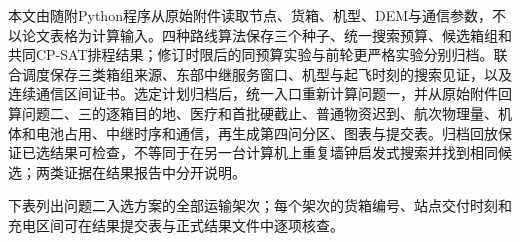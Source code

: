 本文由随附Python程序从原始附件读取节点、货箱、机型、DEM与通信参数，不以论文表格为计算输入。四种路线算法保存三个种子、统一搜索预算、候选箱组和共同CP-SAT排程结果；修订时限后的同预算实验与前轮更严格实验分别归档。联合调度保存三类箱组来源、东部中继服务窗口、机型与起飞时刻的搜索见证，以及连续通信区间证书。选定计划归档后，统一入口重新计算问题一，并从原始附件回算问题二、三的逐箱目的地、医疗和首批硬截止、普通物资迟到、航次物理量、机体和电池占用、中继时序和通信，再生成第四问分区、图表与提交表。归档回放保证已选结果可检查，不等同于在另一台计算机上重复墙钟启发式搜索并找到相同候选；两类证据在结果报告中分开说明。

下表列出问题二入选方案的全部运输架次；每个架次的货箱编号、站点交付时刻和充电区间可在结果提交表与正式结果文件中逐项核查。

